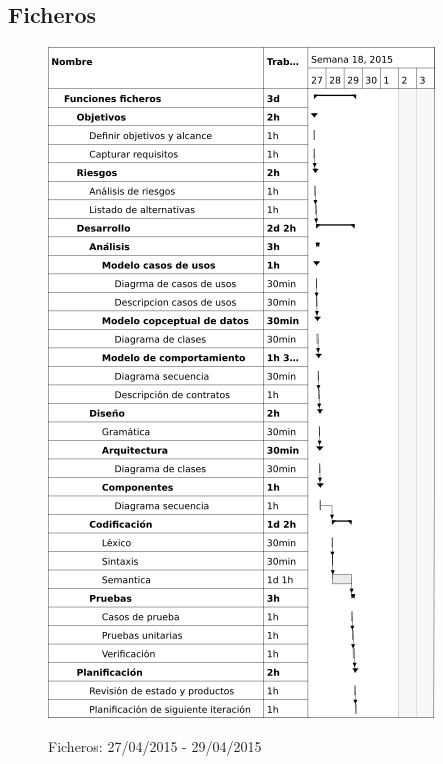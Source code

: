 \subsection{Ficheros}
\begin{center}
\begin{figure}[H]
\centering
\includegraphics[scale=1]{planning/24-funciones-ficheros.png} \\
\caption{Ficheros: 27/04/2015 - 29/04/2015 }
\end{figure}
\end{center}

